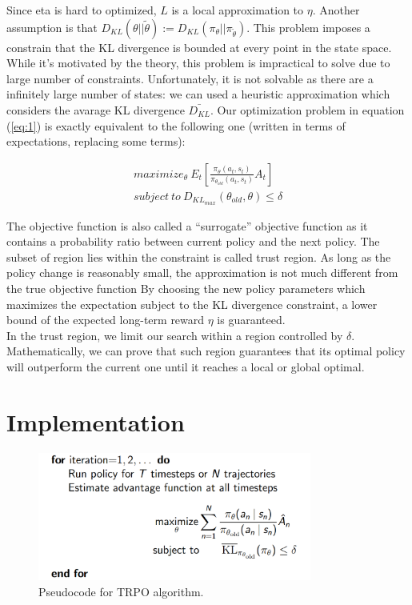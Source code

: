 \documentclass[11pt]{article}
\begin{document}
Since eta is hard to optimized, $L$ is a local approximation to $\eta$. Another
assumption is that $D_{KL}(\theta|| \tilde{\theta}) :=
D_{KL}(\pi_{\theta}||\pi_{\tilde{\theta}})$. This problem imposes a constrain that the KL
divergence is bounded at every point in the state space. While it's motivated by the
theory, this problem is impractical to solve due to large number of constraints.
Unfortunately, it is not solvable as there are a infinitely large number of
states: we can used a heuristic approximation which considers the avarage KL
divergence $\bar{D_{KL}}$. Our optimization problem in equation (\ref{eq:1}) is exactly
equivalent to the following one (written in terms of expectations, replacing some terms):

\begin{equation}
        \begin{split}
        maximize_{\theta} \ E_t[\frac{\pi_{\theta}(a_t, s_t)}{\pi_{\theta_{old}}(a_t, s_t)}A_t]
        \\ \label{eq:2}
        subject \  to \ D_{KL_{max}}(\theta_{old}, \theta) \leq \delta
        \end{split}
\end{equation}

The objective function is also called a “surrogate” objective function as it contains a
probability ratio between current policy and the next policy. The subset of region lies
within the constraint is called trust region. As long as the policy change is reasonably
small, the approximation is not much different from the true objective function By
choosing the new policy parameters which maximizes the expectation subject to the KL
divergence constraint, a lower bound of the expected long-term reward $\eta$ is guaranteed.
\\
In the trust region, we limit our search within a region controlled by $\delta$.
Mathematically, we can prove that such region guarantees that its optimal policy will
outperform the current one until it reaches a local or global optimal.

\section{Implementation}
\begin{figure}[t]
        \includegraphics[width=9cm]{pseudocode}
        \centering
        \caption{Pseudocode for TRPO algorithm.}
        \label{fig:functions}
\end{figure}
\end{document}
